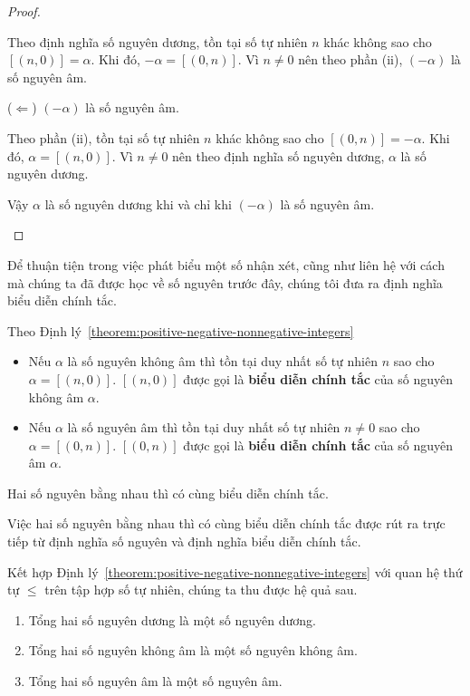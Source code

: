 \begin{proof}
\begin{enumerate}[label={(\roman*)}]
		      Theo định nghĩa số nguyên dương, tồn tại số tự nhiên $n$ khác không sao cho $[(n, 0)] = \alpha$. Khi đó, $-\alpha = [(0, n)]$. Vì $n\ne 0$ nên theo phần (ii), $(-\alpha)$ là số nguyên âm.

		      ($\Leftarrow$) $(-\alpha)$ là số nguyên âm.

		      Theo phần (ii), tồn tại số tự nhiên $n$ khác không sao cho $[(0, n)] = -\alpha$. Khi đó, $\alpha = [(n, 0)]$. Vì $n\ne 0$ nên theo định nghĩa số nguyên dương, $\alpha$ là số nguyên dương.

		      Vậy $\alpha$ là số nguyên dương khi và chỉ khi $(-\alpha)$ là số nguyên âm.
	\end{enumerate}
\end{proof}

Để thuận tiện trong việc phát biểu một số nhận xét, cũng như liên hệ với cách mà chúng ta đã được học về số nguyên trước đây, chúng tôi đưa ra định nghĩa biểu diễn chính tắc.
\begin{proposition}
	Theo Định lý~\ref{theorem:positive-negative-nonnegative-integers}
	\begin{itemize}
		\item Nếu $\alpha$ là số nguyên không âm thì tồn tại duy nhất số tự nhiên $n$ sao cho $\alpha = [(n, 0)]$. $[(n, 0)]$ được gọi là \textbf{biểu diễn chính tắc} của số nguyên không âm $\alpha$.
		\item Nếu $\alpha$ là số nguyên âm thì tồn tại duy nhất số tự nhiên $n\ne 0$ sao cho $\alpha = [(0, n)]$. $[(0, n)]$ được gọi là \textbf{biểu diễn chính tắc} của số nguyên âm $\alpha$.
	\end{itemize}

	Hai số nguyên bằng nhau thì có cùng biểu diễn chính tắc.
\end{proposition}

Việc hai số nguyên bằng nhau thì có cùng biểu diễn chính tắc được rút ra trực tiếp từ định nghĩa số nguyên và định nghĩa biểu diễn chính tắc.

Kết hợp Định lý~\ref{theorem:positive-negative-nonnegative-integers} với quan hệ thứ tự $\leq$ trên tập hợp số tự nhiên, chúng ta thu được hệ quả sau.

\begin{corollary}\label{corollary:positivity-negativity-nonnegativity-of-sum-of-integers}
	\begin{enumerate}[label={(\roman*)}]
		\item Tổng hai số nguyên dương là một số nguyên dương.
		\item Tổng hai số nguyên không âm là một số nguyên không âm.
		\item Tổng hai số nguyên âm là một số nguyên âm.
	\end{enumerate}
\end{corollary}

